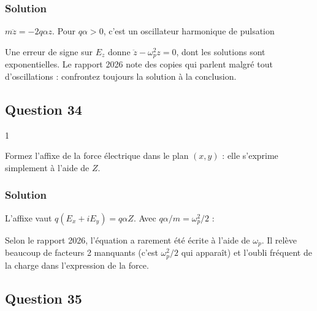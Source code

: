 \documentclass[11pt,a4paper]{article}
\newcommand{\equationajustee}[1]{%
  \sbox{\boiteequation}{$\displaystyle #1$}%
  \ifdim\wd\boiteequation>\linewidth
    \[\resizebox{\linewidth}{!}{\usebox{\boiteequation}}\]%
  \else
    \[#1\]%
  \fi}
\begin{document}
\hypertarget{solution-32}{%
\subsubsection{Solution}\label{solution-32}}

\(m\ddot z=-2q\alpha z\). Pour \(q\alpha>0\), c'est un oscillateur harmonique de pulsation

\equationajustee{\boxed{\omega_p=\sqrt{\frac{2q\alpha}{m}}}}

\begin{piege}

Une erreur de signe sur \(E_z\) donne \(\ddot z-\omega_p^2z=0\), dont les solutions sont exponentielles. Le rapport 2026 note des copies qui parlent malgré tout d'oscillations : confrontez toujours la solution à la conclusion.

\end{piege}

\hypertarget{question-34}{%
\subsection{Question 34}\label{question-34}}

\begin{indication}{1}

Formez l'affixe de la force électrique dans le plan \((x,y)\) : elle s'exprime simplement à l'aide de \(Z\).

\end{indication}

\hypertarget{solution-33}{%
\subsubsection{Solution}\label{solution-33}}

L'affixe vaut \(q(E_x+iE_y)=q\alpha Z\). Avec \(q\alpha/m=\omega_p^2/2\) :

\equationajustee{\boxed{\ddot Z+i\omega_0\dot Z-\frac{\omega_p^2}2Z=0}}

\begin{jury}

Selon le rapport 2026, l'équation a rarement été écrite à l'aide de \(\omega_p\). Il relève beaucoup de facteurs 2 manquants (c'est \(\omega_p^2/2\) qui apparaît) et l'oubli fréquent de la charge dans l'expression de la force.

\end{jury}

\hypertarget{question-35}{%
\subsection{Question 35}\label{question-35}}
\end{document}
